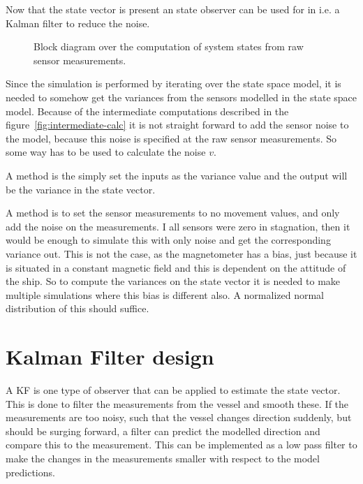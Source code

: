 Now that the state vector is present an state observer can be used for
in i.e. a Kalman filter to reduce the noise.

\begin{figure}
	\centering
	
	\caption{Block diagram over the computation of system states from
	raw sensor measurements.}
	\label{fig:intermediate-calc}
\end{figure}

Since the simulation is performed by iterating over the state space
model, it is needed to somehow get the variances from the sensors
modelled in the state space model. Because of the intermediate
computations described in the figure~\vref{fig:intermediate-calc} it
is not straight forward to add the sensor noise to the model, because
this noise is specified at the raw sensor measurements. So some way
has to be used to calculate the noise $v$.

A method is the simply set the inputs as the variance value and the
output will be the variance in the state vector. 

A method is to set the sensor measurements to no movement values, and
only add the noise on the measurements. I all sensors were zero in
stagnation, then it would be enough to simulate this with only noise and
get the corresponding variance out. This is not the case, as the
magnetometer has a bias, just because it is situated in a constant
magnetic field and this is dependent on the attitude of the ship. So
to compute the variances on the state vector it is needed to make
multiple simulations where this bias is different also. A normalized
normal distribution of this should suffice. 

\section{Kalman Filter design}

A \ac{KF} is one type of observer that can be applied to estimate the state vector. This is done to filter the measurements from the vessel and smooth these. If the measurements are too noisy, such that the vessel changes direction suddenly, but should be surging forward, a filter can predict the modelled direction and compare this to the measurement. This can be implemented as a low pass filter to make the changes in the measurements smaller with respect to the model predictions.

